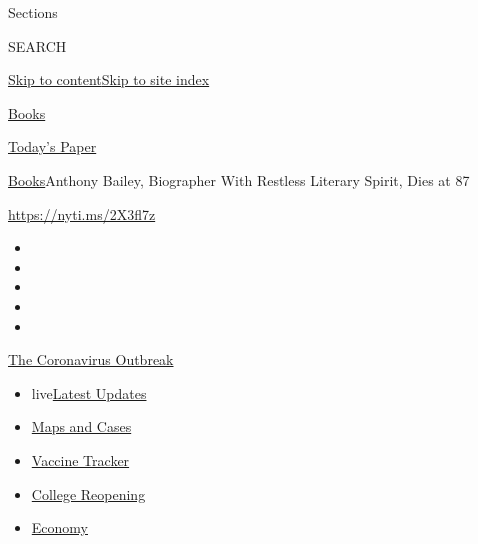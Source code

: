 Sections

SEARCH

\protect\hyperlink{site-content}{Skip to
content}\protect\hyperlink{site-index}{Skip to site index}

\href{https://www.nytimes3xbfgragh.onion/section/books}{Books}

\href{https://myaccount.nytimes3xbfgragh.onion/auth/login?response_type=cookie\&client_id=vi}{}

\href{https://www.nytimes3xbfgragh.onion/section/todayspaper}{Today's
Paper}

\href{/section/books}{Books}\textbar{}Anthony Bailey, Biographer With
Restless Literary Spirit, Dies at 87

\url{https://nyti.ms/2X3fl7z}

\begin{itemize}
\item
\item
\item
\item
\item
\end{itemize}

\href{https://www.nytimes3xbfgragh.onion/news-event/coronavirus?action=click\&pgtype=Article\&state=default\&region=TOP_BANNER\&context=storylines_menu}{The
Coronavirus Outbreak}

\begin{itemize}
\tightlist
\item
  live\href{https://www.nytimes3xbfgragh.onion/2020/08/04/world/coronavirus-covid-19.html?action=click\&pgtype=Article\&state=default\&region=TOP_BANNER\&context=storylines_menu}{Latest
  Updates}
\item
  \href{https://www.nytimes3xbfgragh.onion/interactive/2020/us/coronavirus-us-cases.html?action=click\&pgtype=Article\&state=default\&region=TOP_BANNER\&context=storylines_menu}{Maps
  and Cases}
\item
  \href{https://www.nytimes3xbfgragh.onion/interactive/2020/science/coronavirus-vaccine-tracker.html?action=click\&pgtype=Article\&state=default\&region=TOP_BANNER\&context=storylines_menu}{Vaccine
  Tracker}
\item
  \href{https://www.nytimes3xbfgragh.onion/2020/08/02/us/covid-college-reopening.html?action=click\&pgtype=Article\&state=default\&region=TOP_BANNER\&context=storylines_menu}{College
  Reopening}
\item
  \href{https://www.nytimes3xbfgragh.onion/live/2020/08/03/business/stock-market-today-coronavirus?action=click\&pgtype=Article\&state=default\&region=TOP_BANNER\&context=storylines_menu}{Economy}
\end{itemize}

